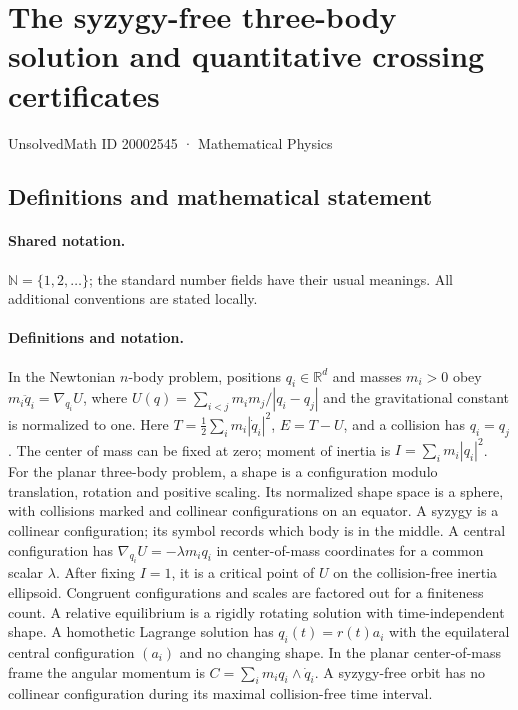 \documentclass[11pt]{article}
\begin{document}
\setcounter{section}{20002544}
\section{The syzygy-free three-body solution and quantitative crossing certificates}\label{20002545}
{\small UnsolvedMath ID 20002545 · Mathematical Physics}
\subsection{Definitions and mathematical statement}

\paragraph{Shared notation.}$\mathbb N=\{1,2,\ldots\}$; the standard number fields have their usual meanings. All additional conventions are stated locally.


\paragraph{Definitions and notation.}In the Newtonian $n$-body problem, positions $q_i\in\mathbb R^d$ and masses $m_i>0$ obey $m_i\ddot q_i=\nabla_{q_i}U$, where $U(q)=\sum_{i<j}m_im_j/|q_i-q_j|$ and the gravitational constant is normalized to one. Here $T=\tfrac12\sum_i m_i|\dot q_i|^2$, $E=T-U$, and a collision has $q_i=q_j$. The center of mass can be fixed at zero; moment of inertia is $I=\sum_i m_i|q_i|^2$. For the planar three-body problem, a shape is a configuration modulo translation, rotation and positive scaling. Its normalized shape space is a sphere, with collisions marked and collinear configurations on an equator. A syzygy is a collinear configuration; its symbol records which body is in the middle. A central configuration has $\nabla_{q_i}U=-\lambda m_iq_i$ in center-of-mass coordinates for a common scalar $\lambda$. After fixing $I=1$, it is a critical point of $U$ on the collision-free inertia ellipsoid. Congruent configurations and scales are factored out for a finiteness count. A relative equilibrium is a rigidly rotating solution with time-independent shape. A homothetic Lagrange solution has $q_i(t)=r(t)a_i$ with the equilateral central configuration $(a_i)$ and no changing shape. In the planar center-of-mass frame the angular momentum is $C=\sum_i m_iq_i\wedge\dot q_i$. A syzygy-free orbit has no collinear configuration during its maximal collision-free time interval.
\end{document}
